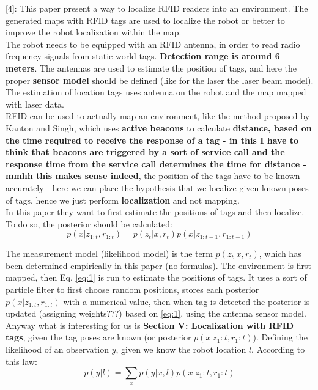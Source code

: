 \documentclass[11pt,a4paper]{article}
\begin{document}
[4]: This paper present a way to localize RFID readers into an environment. The generated maps with RFID tags are used to localize the robot or better to improve the robot localization within the map. \\
The robot needs to be equipped with an RFID antenna, in order to read radio frequency signals from static world tags. \textbf{Detection range is around 6 meters}. The antennas are used to estimate the position of tags, and here the proper \textbf{sensor model} should be defined (like for the laser the laser beam model). The estimation of location tags uses antenna on the robot and the map mapped with laser data.\\
RFID can be used to actually map an environment, like the method proposed by Kanton and Singh, which uses \textbf{active beacons} to calculate \textbf{distance, based on the time required to receive the response of a tag - in this I have to think that beacons are triggered by a sort of service call and the response time from the service call determines the time for distance - mmhh this makes sense indeed}, the position of the tags have to be known accurately - here we can place the hypothesis that we localize given known poses of tags, hence we just perform \textbf{localization} and not mapping. \\
In this paper they want to first estimate the positions of tags and then localize. To do so, the posterior should be calculated: 
\begin{equation}
p(x|z_{1:t},r_{1:t}) = p(z_t|x,r_t)p(x|z_{1:t-1},r_{1:t-1}) \label{eq:1}
\end{equation}

The measurement model (likelihood model) is the term $p(z_t|x,r_t)$, which has been determined empirically in this paper (no formulas). The environment is first mapped, then Eq. \ref{eq:1} is run to estimate the positions of tags. It uses a sort of particle filter to first choose random positions, stores each posterior $p(x|z_{1:t},r_{1:t})$ with a numerical value, then when tag is detected the posterior is updated (assigning weights???) based on \ref{eq:1}, using the antenna sensor model. \\

Anyway what is interesting for us is \textbf{Section V: Localization with RFID tags}, given the tag poses are known (or posterior $p(x|z_1:t,r_1:t)$). Defining the likelihood of an observation $y$, given we know the robot location $l$. According to this law:
\begin{equation}
p(y|l) = \sum_{x} p(y|x,l)p(x|z_1:t,r_1:t) \label{eq:2}
\end{equation}
\end{document}
